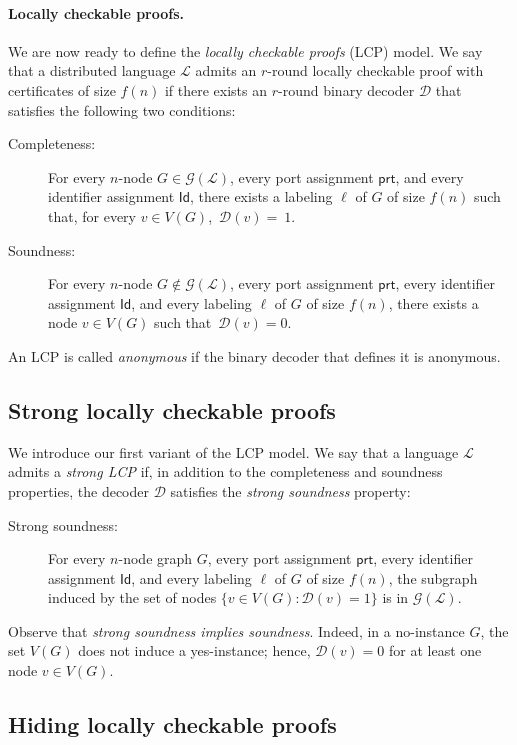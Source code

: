 \documentclass[11pt]{article}
\newcommand*{\ids}{\mathsf{Id}}
\newcommand*{\ports}{\mathsf{prt}}
\begin{document}
\paragraph{Locally checkable proofs.} We are now ready to define the
\emph{locally checkable proofs} (LCP) model. 
We say that a distributed language $\mathcal{L}$ admits an $r$-round locally
checkable proof with certificates of size $f(n)$ if there exists an $r$-round
binary decoder $\mathcal{D}$ that satisfies the following two conditions:
\begin{description}
  \item[Completeness:] For every $n$-node $G \in \mathcal{G}(\mathcal{L})$, every port assignment $\ports$, and every identifier assignment $\ids$, there exists a labeling $\ell$ of $G$ of size $f(n)$ such that, for every $v \in V(G)$,~$\mathcal{D}(v) =~1$.
  \item[Soundness:] For every $n$-node $G \notin \mathcal{G}(\mathcal{L})$, every port assignment $\ports$, every identifier assignment $\ids$, and every labeling $\ell$ of $G$ of size $f(n)$, there exists a node $v \in V(G)$ such that~$\mathcal{D}(v) = 0$.
\end{description}
An LCP is called \emph{anonymous} if the binary decoder that defines it is
anonymous.

\subsection{Strong locally checkable proofs}

We introduce our first variant of the LCP model. We say that a language $\mathcal{L}$ admits a \emph{strong LCP} if, in addition to the completeness and soundness properties, the decoder $\mathcal{D}$ satisfies the \emph{strong soundness} property:
\begin{description}
  \item[Strong soundness:] For every $n$-node graph $G$, every port assignment
  $\ports$, every identifier assignment $\ids$, and every labeling $\ell$ of $G$
  of size $f(n)$, the subgraph induced by the set of nodes $\{v \in V(G) :
  \mathcal{D}(v) = 1\}$ is in $\mathcal{G}(\mathcal{L})$.
\end{description}
Observe that \emph{strong soundness implies soundness}. 
Indeed, in a no-instance \( G \), the set \( V(G) \) does not induce a
yes-instance; hence, \( \mathcal{D}(v) = 0 \) for at least one node \( v \in
V(G) \).

\subsection{Hiding locally checkable proofs}
\label{sec:hiding-def}
\end{document}
